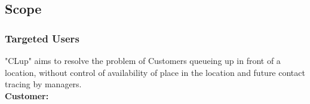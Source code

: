 



\subsection{Scope}

\subsubsection{Targeted Users}

"CLup" aims to resolve the problem of Customers queueing up in front of a location, without control of availability of place in the location and future contact tracing by managers.
\\[0.5cm]
\textbf{Customer:} \\

